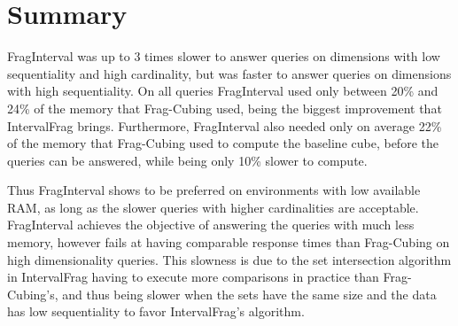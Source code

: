 \section{Summary}\label{ch:interval:summary}

FragInterval was up to 3 times slower to answer queries on dimensions with low sequentiality and high cardinality, but was faster to answer queries on dimensions with high sequentiality.
On all queries FragInterval used only between 20\% and 24\% of the memory that Frag-Cubing used, being the biggest improvement that IntervalFrag brings.
Furthermore, FragInterval also needed only on average 22\% of the memory that Frag-Cubing used to compute the baseline cube, before the queries can be answered, while being only 10\% slower to compute.

Thus FragInterval shows to be preferred on environments with low available RAM, as long as the slower queries with higher cardinalities are acceptable.
FragInterval achieves the objective of answering the queries with much less memory, however fails at having comparable response times than Frag-Cubing on high dimensionality queries.
This slowness is due to the set intersection algorithm in IntervalFrag having to execute more comparisons in practice than Frag-Cubing's, and thus being slower when the sets have the same size and the data has low sequentiality to favor IntervalFrag's algorithm.

